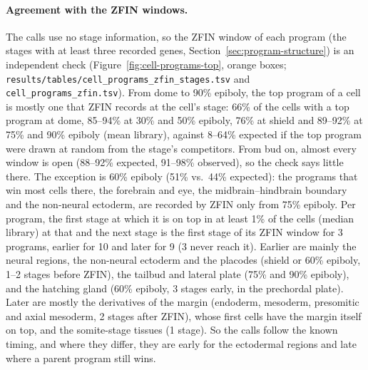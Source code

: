 \documentclass[11pt,a4paper]{article}
\begin{document}
\paragraph{Agreement with the ZFIN windows.} The calls use no stage information, so the ZFIN window of each program (the stages with at least three recorded genes, Section~\ref{sec:program-structure}) is an independent check (Figure~\ref{fig:cell-programs-top}, orange boxes; \nolinkurl{results/tables/cell_programs_zfin_stages.tsv} and \nolinkurl{cell_programs_zfin.tsv}). From dome to 90\% epiboly, the top program of a cell is mostly one that ZFIN records at the cell's stage: 66\% of the cells with a top program at dome, 85--94\% at 30\% and 50\% epiboly, 76\% at shield and 89--92\% at 75\% and 90\% epiboly (mean library), against 8--64\% expected if the top program were drawn at random from the stage's competitors. From bud on, almost every window is open (88--92\% expected, 91--98\% observed), so the check says little there. The exception is 60\% epiboly (51\% vs.\ 44\% expected): the programs that win most cells there, the forebrain and eye, the midbrain--hindbrain boundary and the non-neural ectoderm, are recorded by ZFIN only from 75\% epiboly. Per program, the first stage at which it is on top in at least 1\% of the cells (median library) at that and the next stage is the first stage of its ZFIN window for 3 programs, earlier for 10 and later for 9 (3 never reach it). Earlier are mainly the neural regions, the non-neural ectoderm and the placodes (shield or 60\% epiboly, 1--2 stages before ZFIN), the tailbud and lateral plate (75\% and 90\% epiboly), and the hatching gland (60\% epiboly, 3 stages early, in the prechordal plate). Later are mostly the derivatives of the margin (endoderm, mesoderm, presomitic and axial mesoderm, 2 stages after ZFIN), whose first cells have the margin itself on top, and the somite-stage tissues (1 stage). So the calls follow the known timing, and where they differ, they are early for the ectodermal regions and late where a parent program still wins.
\end{document}
